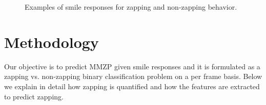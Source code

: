 \documentclass[10pt,journal,cspaper,compsoc]{IEEEtran}
\begin{document}

\begin{figure}[t]
\centering
\caption{Examples of smile responses for zapping and non-zapping behavior.\label{fig:smile_ex}}
\end{figure}

\section{Methodology}%
Our objective is to predict MMZP given smile responses and it is formulated as a zapping vs. non-zapping binary classification problem on a per frame basis. Below we explain in detail how zapping is quantified and how the features are extracted to predict zapping.
\end{document}
